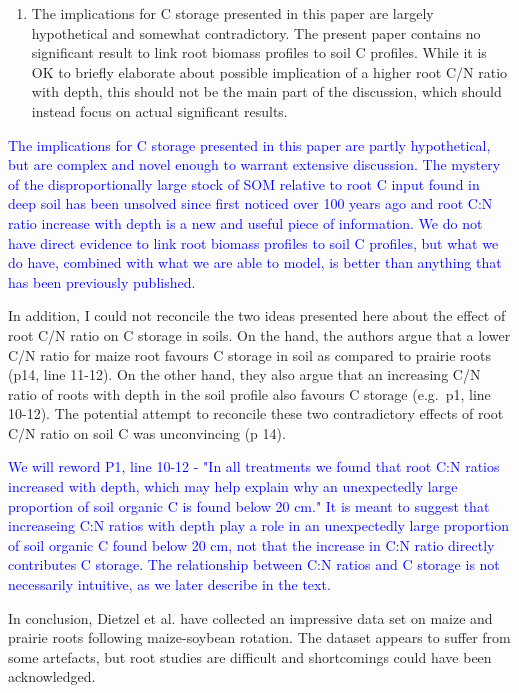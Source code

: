 \documentclass[]{article}
\providecommand{\tightlist}{%
  \setlength{\itemsep}{0pt}\setlength{\parskip}{0pt}}
\begin{document}
\begin{enumerate}
\def\labelenumi{\arabic{enumi})}
\setcounter{enumi}{3}
\tightlist
\item
  The implications for C storage presented in this paper are largely
  hypothetical and somewhat contradictory. The present paper contains no
  significant result to link root biomass profiles to soil C profiles.
  While it is OK to briefly elaborate about possible implication of a
  higher root C/N ratio with depth, this should not be the main part of
  the discussion, which should instead focus on actual significant
  results.
\end{enumerate}

\textcolor{blue}{The implications for C storage presented in this paper are partly hypothetical, but are complex and novel enough to warrant extensive discussion. The mystery of the disproportionally large stock of SOM relative to root C input found in deep soil has been unsolved since first noticed over 100 years ago and root C:N ratio increase with depth is a new and useful piece of information. We do not have direct evidence to link root biomass profiles to soil C profiles, but what we do have, combined with what we are able to model, is better than anything that has been previously published.}

In addition, I could not reconcile the two ideas presented here about
the effect of root C/N ratio on C storage in soils. On the hand, the
authors argue that a lower C/N ratio for maize root favours C storage in
soil as compared to prairie roots (p14, line 11-12). On the other hand,
they also argue that an increasing C/N ratio of roots with depth in the
soil profile also favours C storage (e.g.~p1, line 10-12). The potential
attempt to reconcile these two contradictory effects of root C/N ratio
on soil C was unconvincing (p 14).

\textcolor{blue}{We will reword P1, line 10-12 - "In all treatments we found that root C:N ratios increased with depth, which may help explain why an unexpectedly large proportion of soil organic C is found below 20 cm." It is meant to suggest that increaseing C:N ratios with depth play a role in an unexpectedly large proportion of soil organic C found below 20 cm, not that the increase in C:N ratio directly contributes C storage. The relationship between C:N ratios and C storage is not necessarily intuitive, as we later describe in the text.}

In conclusion, Dietzel et al. have collected an impressive data set on
maize and prairie roots following maize-soybean rotation. The dataset
appears to suffer from some artefacts, but root studies are difficult
and shortcomings could have been acknowledged.
\end{document}
